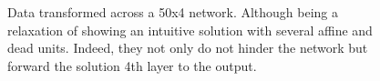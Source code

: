 \begin{figure}[h!]
{{    %
    }
    \parbox{.195\textwidth}{%
    }
  }
    \caption{Data transformed across a 50x4 \SepLayer network. Although being a relaxation of \SepUnitPoint showing an intuitive solution with several affine and dead units. Indeed, they not only do not hinder the network but forward the solution 4th layer to the output.}
    \label{fig:moonsLayerwise}
\end{figure}

